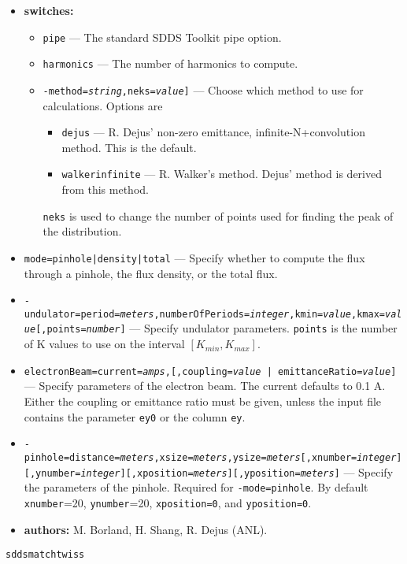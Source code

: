 \documentclass[11pt]{article}
\begin{document}
\begin{itemize}
\item {\bf switches:}
\begin{itemize}
\item {\tt pipe} --- The standard SDDS Toolkit pipe option.
\item {\tt harmonics} --- The number of harmonics to compute.
\item {\tt -method={\em string},neks={\em value}]} --- Choose which method to
 use for calculations.   Options are
 \begin{itemize} 
 \item {\tt dejus} --- R. Dejus' non-zero emittance, infinite-N+convolution method.  This is the
   default.
 \item {\tt walkerinfinite} --- R. Walker's method.  Dejus' method is derived from this method.
 \end{itemize}
 {\tt neks} is used to  change the number of points used for finding the peak of the distribution.
\end{itemize}
\item {\tt mode={pinhole|density|total}} --- Specify whether to compute the flux through a pinhole, the flux density,
  or the total flux.
\item {\tt -undulator=period={\em meters},numberOfPeriods={\em integer},kmin={\em value},kmax={\em value}[,points={\em number}]} ---
  Specify undulator parameters.  {\tt points} is the number of K values to use on the interval $[K_{min}, K_{max}]$.
\item {\tt electronBeam=current={\em amps},[,{coupling={\em value} | emittanceRatio={\em value}}]} --- Specify parameters of the
  electron beam.  The current defaults to 0.1 A.  Either the coupling or emittance ratio must be given, unless the input file
  contains the parameter {\tt ey0} or the column {\tt ey}.
\item {\tt -pinhole=distance={\em meters},xsize={\em meters},ysize={\em meters}}{\tt [,xnumber={\em integer}]}\\
  {\tt [,ynumber={\em integer}]}{\tt [,xposition={\em meters}]}{\tt [,yposition={\em meters}]} ---
  Specify the parameters of the pinhole.  Required for {\tt -mode=pinhole}.  By default {\tt xnumber}=20, {\tt ynumber}=20, 
  {\tt xposition=0}, and {\tt yposition=0}.
\item {\bf authors:} M. Borland, H. Shang, R. Dejus (ANL).
\end{itemize}

\begin{latexonly}
\newpage
\begin{center}{\Large\verb|sddsmatchtwiss|}\end{center}
\end{latexonly}
\end{document}
